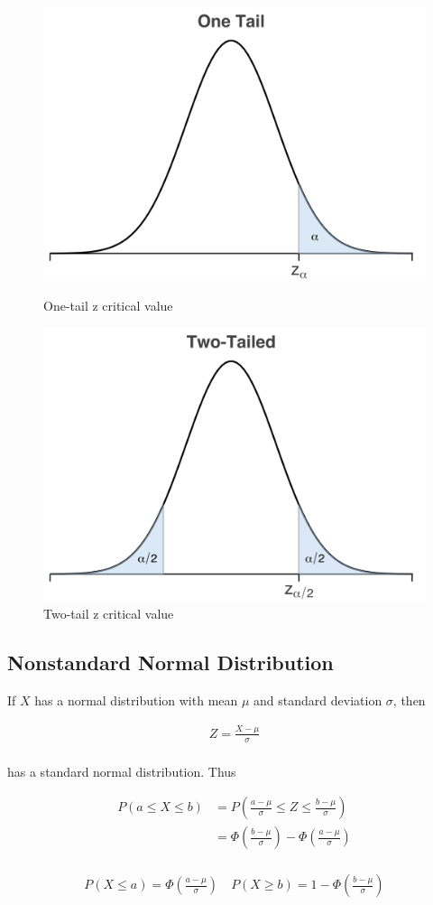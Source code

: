 \begin{figure}[H]
    \centering
    \includegraphics[width=.4\textwidth]{img/4-z-alpha-1}
    \caption{One-tail z critical value}
    \label{fig:4-1}

    \includegraphics[width=.4\textwidth]{img/4-z-alpha-2}
    \caption{Two-tail z critical value}
    \label{fig:4-2}
\end{figure}

\subsection{Nonstandard Normal Distribution}

\begin{proposition}
    If $X$ has a normal distribution with mean $\mu$ and standard deviation $\sigma$, then

    \begin{align*}
        Z = \frac{X - \mu}{\sigma} \\
    \end{align*}

    has a standard normal distribution. Thus

    \begin{align*}
        P(a\leq X\leq b) & = P\left(\frac{a-\mu}{\sigma}\leq Z\leq \frac{b-\mu}{\sigma}\right) \\
        & = \Phi\left(\frac{b-\mu}{\sigma}\right) - \Phi\left(\frac{a-\mu}{\sigma}\right) \\
    \end{align*}

    \begin{align*}
        P(X\leq a) = \Phi\left(\frac{a-\mu}{\sigma}\right)\quad P(X\geq b) = 1-\Phi(\frac{b-\mu}{\sigma}) \\
    \end{align*}
\end{proposition}

